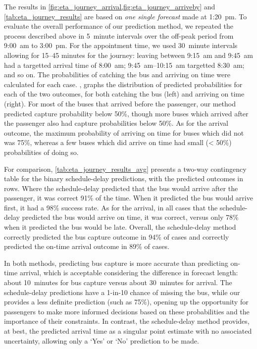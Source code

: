 The results in \cref{fig:eta_journey_arrival,fig:eta_journey_arriveby} and \cref{tab:eta_journey_results} are based on \emph{one single forecast} made at  1:20~pm. To evaluate the overall performance of our prediction method, we repeated the process described above in 5~minute intervals over the off-peak period from  9:00~am to  3:00~pm. For the appointment time, we used 30~minute intervals allowing for 15--45 minutes for the journey: leaving between 9:15~am and 9:45~am had a targetted arrival time of 8:00~am; 9:45~am--10:15~am targetted 8:30~am; and so on. The probabilities of catching the bus and arriving on time were calculated for each case. , graphs the distribution of predicted probabilities for each of the two outcomes, for both catching the bus (left) and arriving on time (right). For most of the buses that arrived before the passenger, our method predicted capture probability below 50\%, though more buses which arrived after the passenger also had capture probabilities below 50\%. As for the arrival outcome, the maximum probability of arriving on time for buses which did not was 75\%, whereas a few buses which did arrive on time had small (< 50\%) probabilities of doing so.


For comparison, \cref{tab:eta_journey_results_avg} presents a two-way contingency table for the binary schedule-delay predictions, with the predicted outcomes in rows. Where the schedule-delay predicted that the bus would arrive after the passenger, it was correct 91\% of the time. When it predicted the bus would arrive first, it had a 98\% success rate. As for the arrival, in all cases that the schedule-delay predicted the bus would arrive on time, it was correct, versus only 78\% when it predicted the bus would be late. Overall, the schedule-delay method correctly predicted the bus capture outcome in 94\% of cases and correctly predicted the on-time arrival outcome in 89\% of cases.


In both methods, predicting bus capture is more accurate than predicting on-time arrival, which is acceptable considering the difference in forecast length: about 10~minutes for bus capture versus about 30~minutes for arrival. The schedule-delay predictions have a 1-in-10 chance of missing the bus, while our \pf{} provides a less definite prediction (such as 75\%), opening up the opportunity for passengers to make more informed decisions based on these probabilities and the importance of their constraints. In contrast, the schedule-delay method provides, at best, the predicted arrival time as a singular point estimate with no associated uncertainty, allowing only a `Yes' or `No' prediction to be made.


